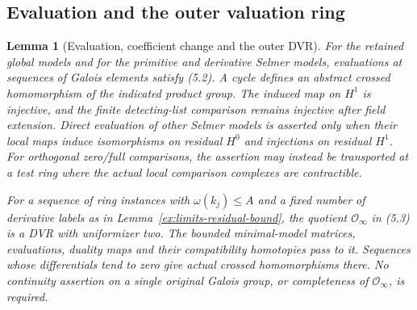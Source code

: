 \documentclass[11pt]{article}
\newtheorem{lemma}[theorem]{Lemma}
\theoremstyle{definition}
\theoremstyle{remark}
\providecommand{\mathscr}[1]{\mathcal{#1}}
\begin{document}
\subsection{Evaluation and the outer valuation ring}
\begin{lemma}[Evaluation, coefficient change and the outer DVR]\label{ex:limits-outer-evaluation}
For the retained global models and for the primitive and derivative
Selmer models, evaluations at sequences of Galois elements satisfy
(5.2). A cycle defines an abstract crossed homomorphism of the
indicated product group. The induced map on $H^1$ is injective,
and the finite detecting-list comparison remains injective after
field extension. Direct evaluation of other Selmer models is asserted
only when their local maps induce isomorphisms on residual $H^0$
and injections on residual $H^1$. For orthogonal zero/full comparisons,
the assertion may instead be transported at a test ring where the
actual local comparison complexes are contractible.

For a sequence of ring instances with $\omega(k_j)\leq A$ and
a fixed number of derivative labels as in
Lemma~\ref{ex:limits-residual-bound}, the quotient
$\mathscr O_\infty$ in (5.3) is a DVR with uniformizer two.
The bounded minimal-model matrices, evaluations, duality maps and
their compatibility homotopies pass to it. Sequences whose
differentials tend to zero give actual crossed homomorphisms
there. No continuity assertion on a single original Galois
group, or completeness of $\mathscr O_\infty$, is required.
\end{lemma}
\end{document}
